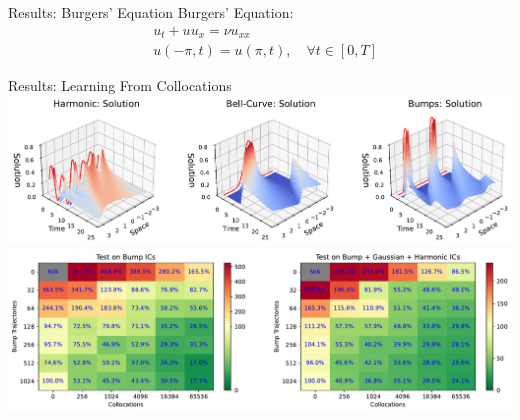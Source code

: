 \documentclass[8pt]{beamer}
\begin{document}
\begin{frame}{Results: Burgers' Equation}
Burgers' Equation:
\begin{equation}
	\begin{split}
		& u_t  + uu_x = \nu u_{xx} \\
	    & u(-\pi, t) = u(\pi, t),\quad \forall t \in [0, T]
	\end{split}
\end{equation}

\end{frame}

\begin{frame}{Results: Learning From Collocations}
\includegraphics[width=\textwidth]{Figures/burgers_examples_of_ics.pdf}
\includegraphics[width=\textwidth]{Figures/data_vs_collocations.pdf}
\end{frame}
\end{document}
